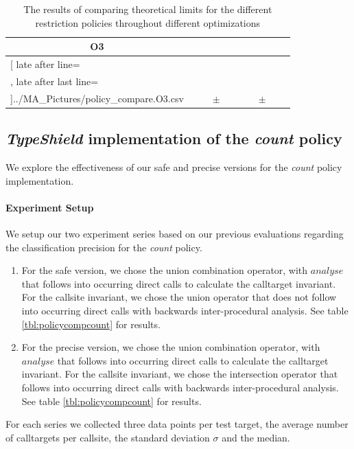 \begin{table}[!htbp]
{\begin{tabular}{l|c|rcl|c|rcl|c}
\multicolumn{1}{c}{\bfseries O3}
	\\\midrule
	\csvreader[ late after line=\\, late after last line=\\\bottomrule]{../MA_Pictures/policy_compare.O3.csv}{
}
	{\csvcolii  &  \csvcoliii & \csvcolx & $\pm$ & \csvcolxi & \csvcolxii & \csvcolxix & $\pm$ & \csvcolxx& \csvcolxxi}%

    	\end{tabular}
}
		\caption {The results of comparing theoretical limits for the different restriction policies throughout different optimizations}
		\label{tbl:policycomp}
\end{table}

\newpage
\subsection{\textit{TypeShield} implementation of the \textit{count} policy}
\label{subsection:typeshieldvslimitcount}
We explore the effectiveness of our safe and precise versions for the \textit{count} policy implementation.

\paragraph{Experiment Setup} We setup our two experiment series based on our previous evaluations regarding the classification precision for the \textit{count} policy.
\begin{enumerate}
\item For the safe version, we chose the union combination operator, with $analyse$ that follows into occurring direct calls to 
calculate the calltarget invariant. For the callsite invariant, we chose the union operator that does not follow into occurring direct calls with backwards inter-procedural analysis.  See table \ref{tbl:policycompcount} for results. 
\item For the precise version, we chose the union combination operator, with $analyse$ that follows into occurring direct calls to calculate the calltarget invariant. For the callsite invariant, we chose the intersection operator that follows into occurring direct calls with backwards inter-procedural analysis. See table \ref{tbl:policycompcount} for results. 
\end{enumerate}
For each series we collected three data points per test target, the average number of calltargets per callsite, the standard deviation $\sigma$ and the median.

